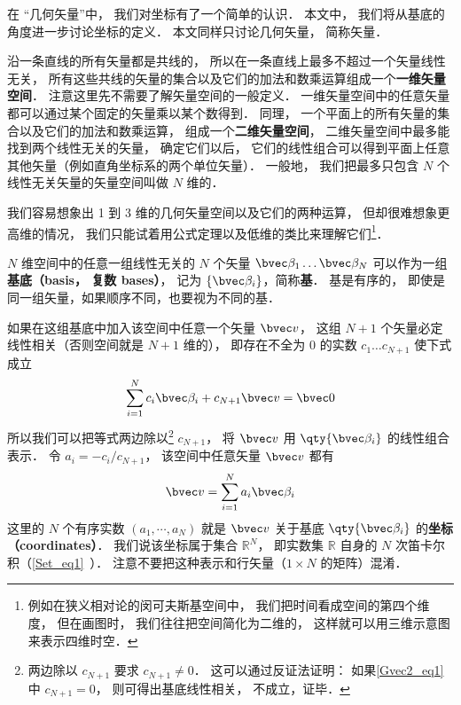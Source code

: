 

在 “几何矢量”中， 我们对坐标有了一个简单的认识． 本文中， 我们将从基底的角度进一步讨论坐标的定义． 本文同样只讨论几何矢量， 简称矢量．

沿一条直线的所有矢量都是共线的， 所以在一条直线上最多不超过一个矢量线性无关， 所有这些共线的矢量的集合以及它们的加法和数乘运算组成一个\textbf{一维矢量空间}． 注意这里先不需要了解矢量空间的一般定义． 一维矢量空间中的任意矢量都可以通过某个固定的矢量乘以某个数得到． 同理， 一个平面上的所有矢量的集合以及它们的加法和数乘运算， 组成一个\textbf{二维矢量空间}， 二维矢量空间中最多能找到两个线性无关的矢量， 确定它们以后， 它们的线性组合可以得到平面上任意其他矢量（例如直角坐标系的两个单位矢量）． 一般地， 我们把最多只包含 $N$ 个线性无关矢量的矢量空间叫做 $N$ 维的．

我们容易想象出 1 到 3 维的几何矢量空间以及它们的两种运算， 但却很难想象更高维的情况， 我们只能试着用公式定理以及低维的类比来理解它们\footnote{例如在狭义相对论的闵可夫斯基空间中， 我们把时间看成空间的第四个维度， 但在画图时， 我们往往把空间简化为二维的， 这样就可以用三维示意图来表示四维时空．}．

$N$ 维空间中的任意一组线性无关的 $N$ 个矢量 $\bvec \beta_1\dots \bvec \beta_N$ 可以作为一组\textbf{基底（basis， 复数 bases）}， 记为 $\{\bvec \beta_i\}$，简称\textbf{基}． 基是有序的， 即使是同一组矢量，如果顺序不同，也要视为不同的基．

如果在这组基底中加入该空间中任意一个矢量 $\bvec v$， 这组 $N+1$ 个矢量必定线性相关（否则空间就是 $N+1$ 维的）， 即存在不全为 0 的实数 $c_1\dots c_{N+1}$ 使下式成立
\begin{equation}\label{Gvec2_eq1}
\sum_{i=1}^{N} c_i \bvec \beta_i + c_{N+1} \bvec v = \bvec 0
\end{equation}
所以我们可以把等式两边除以\footnote{两边除以 $c_{N+1}$ 要求 $c_{N+1} \ne 0$． 这可以通过反证法证明： 如果\autoref{Gvec2_eq1} 中 $c_{N+1} = 0$， 则可得出基底线性相关， 不成立，证毕．} $c_{N+1}$， 将 $\bvec v$ 用 $\qty{\bvec \beta_i}$ 的线性组合表示． 令 $a_i = -c_i/c_{N+1}$， 该空间中任意矢量 $\bvec v$ 都有
\begin{equation}\label{Gvec2_eq5}
\bvec v = \sum_{i=1}^N a_i \bvec \beta_i
\end{equation}
这里的 $N$ 个有序实数 $(a_1, \cdots, a_N)$ 就是 $\bvec v$ 关于基底 $\qty{\bvec \beta_i}$ 的\textbf{坐标（coordinates）}． 我们说该坐标属于集合 $\mathbb R^N$， 即实数集 $\mathbb R$ 自身的 $N$ 次笛卡尔积（\autoref{Set_eq1}~）． 注意不要把这种表示和行矢量（$1\times N$ 的矩阵）混淆．

